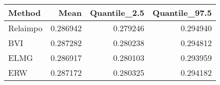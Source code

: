 \begin{table}[ht]
\centering
\begin{tabular}{lrrr}
  \hline
Method & Mean & Quantile\_2.5 & Quantile\_97.5 \\ 
  \hline
Relaimpo & 0.286942 & 0.279246 & 0.294940 \\ 
  BVI & 0.287282 & 0.280238 & 0.294812 \\ 
  ELMG & 0.286917 & 0.280103 & 0.293959 \\ 
  ERW & 0.287172 & 0.280325 & 0.294182 \\ 
   \hline
\end{tabular}
\end{table}
